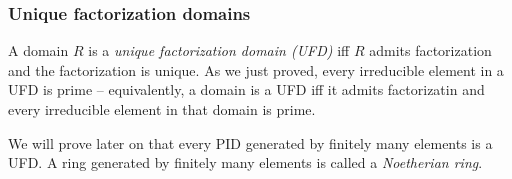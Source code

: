 \documentclass[12pt]{article}
\begin{document}
\subsubsection{Unique factorization domains}
A domain $R$ is a \textit{unique factorization domain (UFD)} iff $R$ admits factorization and the factorization is unique. As we just proved, every irreducible element in a UFD is prime -- equivalently, a domain is a UFD iff it admits factorizatin and every irreducible element in that domain is prime.
\par
We will prove later on that every PID generated by finitely many elements is a UFD. A ring generated by finitely many elements is called a \textit{Noetherian ring}.
\end{document}
